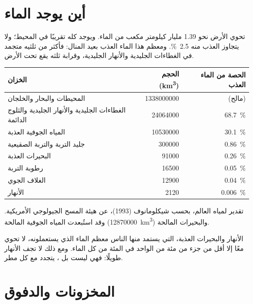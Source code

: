 \section{أين يوجد الماء}

تحوي الأرض نحو 1.39 مليار كيلومتر مكعب من الماء. ويوجد كله تقريبًا في المحيط؛
ولا يتجاوز العذب منه \qty{2.5}{\percent}. ومعظم هذا الماء العذب بعيد المنال: فأكثر
من ثلثيه متجمد في الغطاءات الجليدية والأنهار الجليدية، وقرابة ثلثه يقع تحت
الأرض.

\begin{center}
\small
\begin{tabular}{|l|r|r|}
\hline
\textbf{الخزان} & \textbf{الحجم (\unit{km^3})} & \textbf{الحصة من الماء العذب} \\ \hline
المحيطات والبحار والخلجان & \num{1338000000} & (مالح) \\ \hline
الغطاءات الجليدية والأنهار الجليدية والثلوج الدائمة & \num{24064000} & \qty{68.7}{\percent} \\ \hline
المياه الجوفية العذبة & \num{10530000} & \qty{30.1}{\percent} \\ \hline
جليد التربة والتربة الصقيعية & \num{300000} & \qty{0.86}{\percent} \\ \hline
البحيرات العذبة & \num{91000} & \qty{0.26}{\percent} \\ \hline
رطوبة التربة & \num{16500} & \qty{0.05}{\percent} \\ \hline
الغلاف الجوي & \num{12900} & \qty{0.04}{\percent} \\ \hline
الأنهار & \num{2120} & \qty{0.006}{\percent} \\ \hline
\end{tabular}

{\small تقدير لمياه العالم، بحسب شيكلومانوف (1993)، عن هيئة المسح
الجيولوجي الأمريكية. وقد استُبعدت المياه الجوفية المالحة (\num{12870000}~\unit{km^3})
والبحيرات المالحة.}
\end{center}

الأنهار والبحيرات العذبة، التي يستمد منها الناس معظم الماء الذي يستعملونه، لا تحوي
معًا إلا أقل من جزء من مئة من الواحد في المئة من كل الماء. ومع ذلك لا تجف الأنهار
طويلًا: فهي ليست  بل ، يتجدد مع كل
مطر.

\section{المخزونات والدفوق}

